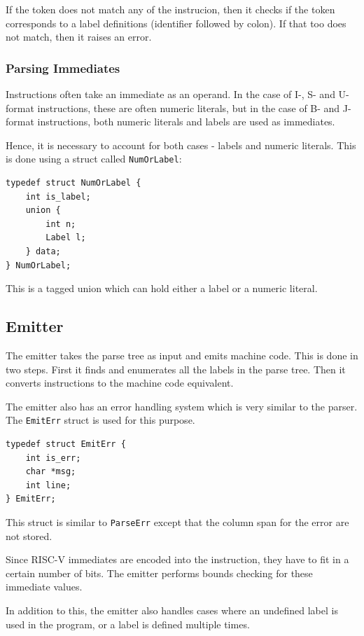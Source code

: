 \documentclass{article}
\begin{document}
If the token does not match any of the instrucion, then
it checks if the token corresponds to a label definitions
(identifier followed by colon). If that too does not match,
then it raises an error.

\subsubsection{Parsing Immediates}

Instructions often take an immediate as an operand. In
the case of I-, S- and U-format instructions, these
are often numeric literals, but in the case of B- and
J- format instructions, both numeric literals and labels
are used as immediates.

Hence, it is necessary to account for both cases - labels
and numeric literals. This is done using a struct called 
\texttt{NumOrLabel}:

\begin{verbatim}
typedef struct NumOrLabel {
    int is_label;
    union {
        int n;
        Label l;
    } data;
} NumOrLabel;    
\end{verbatim}

This is a tagged union which can hold either a label or a numeric literal.

\subsection{Emitter}

The emitter takes the parse tree as input and emits
machine code. This is done in two steps. First it
finds and enumerates all the labels in the parse
tree. Then it converts instructions to the machine
code equivalent.

The emitter also has an error handling system which
is very similar to the parser. The \texttt{EmitErr}
struct is used for this purpose.

\begin{verbatim}
typedef struct EmitErr {
    int is_err;
    char *msg;
    int line;
} EmitErr;
\end{verbatim}

This struct is similar to \texttt{ParseErr} except that
the column span for the error are not stored.

Since RISC-V immediates are encoded into the instruction,
they have to fit in a certain number of bits. The emitter
performs bounds checking for these immediate values.

In addition to this, the emitter also handles cases where
an undefined label is used in the program, or a label
is defined multiple times.
\end{document}

